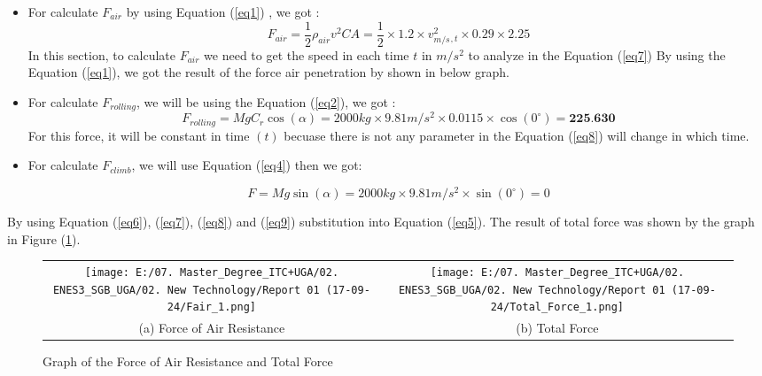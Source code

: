 \documentclass[12pt,a4paper]{article}
\numberwithin{equation}{section}
\begin{document}
	\begin{itemize}[label=-]
		\item For calculate $F_{air}$ by using Equation (\ref{eq1}) , we got :
			\begin{equation}
				F_{air} = \frac{1}{2}\rho_{air}v^2CA = \frac{1}{2}\times1.2\times 	v^2_{m/s}_{,t}\times0.29\times 2.25 \label{eq7}
			\end{equation}
			In this section, to calculate $F_{air}$ we need to get the speed in each time $t$ in $m/s^2$ to analyze in the Equation (\ref{eq7})
			By using the Equation (\ref{eq1}), we got the result of the force air penetration by shown in below graph.
		\item For calculate $F_{rolling}$, we will be using the Equation (\ref{eq2}), we got :
			\begin{equation}
				F_{rolling} = MgC_r\cos(\alpha) = 2000kg\times9.81m/s^2\times0.0115\times\cos(0^\circ) = \textbf{225.630} \label{eq8}
			\end{equation}
			For this force, it will be constant in time $(t)$ becuase there is not any parameter in the Equation (\ref{eq8}) will change in which time.
			
			
		\item For calculate $F_{climb}$, we will use Equation (\ref{eq4}) then we got:
		
			\begin{equation}
				F = Mg\sin(\alpha) = 2000kg \times 9.81m/s^2 \times \sin(0^\circ) = 0 \label{eq9}
			\end{equation}		
	\end{itemize}

	By using Equation (\ref{eq6}), (\ref{eq7}), (\ref{eq8}) and (\ref{eq9}) substitution into Equation (\ref{eq5}). The result of total force was shown by the graph in Figure (\ref{4}).
	
	\begin{figure}[htbp]
		\centering
		\begin{tabular}{c @{\qquad} c}
			\texttt{[image: E:/07. Master\_Degree\_ITC+UGA/02. ENES3\_SGB\_UGA/02. New Technology/Report 01 (17-09-24/Fair\_1.png]} &
			\texttt{[image: E:/07. Master\_Degree\_ITC+UGA/02. ENES3\_SGB\_UGA/02. New Technology/Report 01 (17-09-24/Total\_Force\_1.png]} \\
			
			\small (a) Force of Air Resistance & \small (b) Total Force
		\end{tabular}
		
		\caption{\small Graph of the  Force of Air Resistance and Total Force}
		\label{4}
	\end{figure}
		
\end{document}
